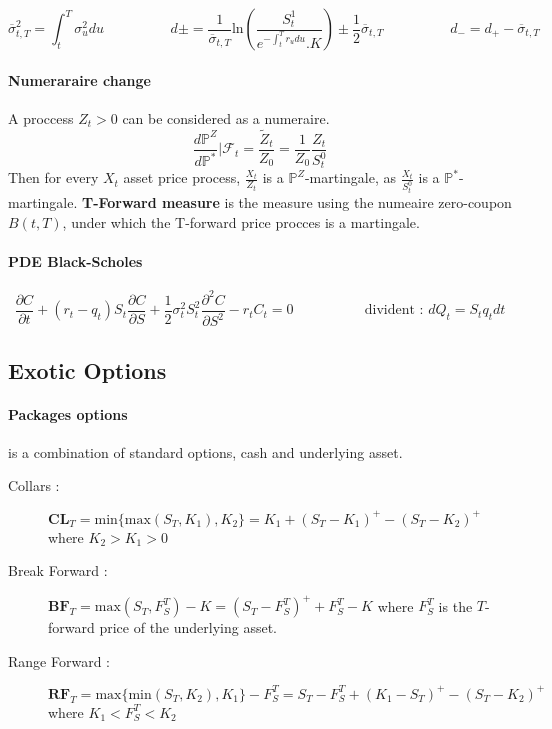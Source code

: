 \documentclass[a4paper,10pt]{article}
\begin{document}
\[
\overline{\sigma}^2_{t,T} = \int^T_t \sigma^2_u du
\hspace{2cm}
d\pm =  \frac{1}{\overline{\sigma}_{t,T}} \text{ln}(\frac{S^1_t}{e^{- \int^T_t r_udu }.K}) \pm \frac{1}{2}\overline{\sigma}_{t,T}
\hspace{2cm}
d_- = d_+  - \overline{\sigma}_{t,T}
\]
\paragraph{Numeraraire change }
A proccess $Z_t > 0$ can be considered as a numeraire. 
\[
\frac{d\mathbb{P}^{Z}}{d\mathbb{P}^*} | \mathcal{F}_t = \frac{\widetilde{Z}_t }{Z_0} = \frac{1}{Z_0} \frac{Z_t}{S^0_t} 
\]
Then for every $X_t$ asset price process, $\frac{X_t}{Z_t}$ is a $\mathbb{P}^Z$-martingale, as $\frac{X_t}{S^0_t}$ is a $\mathbb{P}^*$-martingale. 
\textbf{T-Forward measure } is the measure using the numeaire zero-coupon $B(t,T)$, under which the T-forward price procces is a martingale.

\paragraph{PDE Black-Scholes}
\[
\frac{\partial C}{\partial t} +
(r_t - q_t)S_t \frac{\partial C}{\partial S} + 
\frac{1}{2}\sigma^2_tS^2_t \frac{\partial^2 C}{\partial S^2} -
r_t C_t =0
\hspace{2cm}
\text{ divident : } dQ_t = S_t q_t dt 
\]
\subsection{Exotic Options}
\paragraph{Packages options} is a combination of standard options, cash and underlying asset.
\begin{description}
 \item[Collars : ] $\textbf{CL}_T = \text{min}\{ \text{max}(S_T,K_1),K_2\} = K_1 +(S_T-K_1)^+ - (S_T - K_2)^+ $ where $K_2>K_1>0$
 \item[Break Forward : ] $\textbf{BF}_T = \text{max}(S_T,F_S^T)-K = (S_T- F_S^T)^+ +F_S^T -K $ where $F_S^T$ is the $T$-forward price of the underlying asset.
 \item[Range Forward : ] $\textbf{RF}_T = \text{max}\{ \text{min}(S_T,K_2),K_1\} - F_S^T  = S_T - F_S^T +(K_1 - S_T)^+ - (S_T-K_2)^+ $ where $K_1<F_S^T<K_2$
\end{description}
\end{document}
